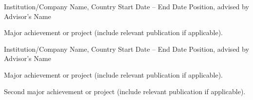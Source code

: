 
\researchitem
{Institution/Company Name, Country}
{Start Date -- End Date}
{Position, advised by Advisor's Name}
{%
  \item Major achievement or project (include relevant publication if applicable).
}

\researchitem
{Institution/Company Name, Country}
{Start Date -- End Date}
{Position, advised by Advisor's Name}
{%
  \item Major achievement or project (include relevant publication if applicable).
  \item Second major achievement or project (include relevant publication if applicable).
}

